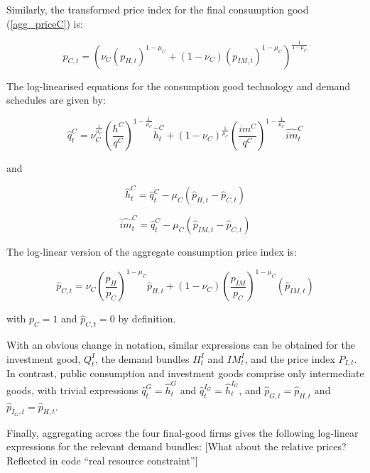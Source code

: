 \documentclass[a4paper,11pt]{article}
\numberwithin{equation}{section}
\begin{document}
	Similarly, the transformed price index for the final consumption good (\ref{agg_priceC}) is:
	
	\begin{equation}
	p_{C,t}=\left(\nu_C\left(p_{H,t}\right)^{1-\mu_C}+(1-\nu_C)\left(p_{IM,t}\right)^{1-\mu_C}\right)^{\frac{1}{1-\mu_C}}
	\end{equation}
	
	The log-linearised equations for the consumption good technology and demand schedules are given by:
	
	\begin{equation}
	\hat{q}_t^C=\nu_C^{\frac{1}{\mu_C}}\left(\frac{h^C}{q^C}\right)^{1-\frac{1}{\mu_C}}\hat{h}_t^C+(1-\nu_C)^{\frac{1}{\mu_C}}\left(\frac{im^C}{q^C}\right)^{1-\frac{1}{\mu_C}}\widehat{im}_t^C
	\end{equation}
	
	and
	
	\begin{equation}
	\hat{h}_t^C=\hat{q}_t^C-\mu_C\left(\hat{p}_{H,t}-\hat{p}_{C,t}\right)
	\end{equation}
	
	\begin{equation}
	\widehat{im}_t^C=\hat{q}_t^C-\mu_C\left(\hat{p}_{IM,t}-\hat{p}_{C,t}\right)
	\end{equation}
	
	The log-linear version of the aggregate consumption price index is:
	
	\begin{equation}
	\hat{p}_{C,t}=\nu_C\left(\frac{p_H}{p_C}\right)^{1-\mu_C}\hat{p}_{H,t}+(1-\nu_C)\left(\frac{p_{IM}}{p_C}\right)^{1-\mu_C}\left(\hat{p}_{IM,t}\right)
	\end{equation}
	
	with $p_C=1$ and $\hat{p}_{C,t}=0$ by definition.
	
	With an obvious change in notation, similar expressions can be obtained for the investment good, $Q_t^I$, the demand bundles $H_t^I$ and $IM_t^I$, and the price index $P_{I,t}$. In contrast, public consumption and investment goods comprise only intermediate goods, with trivial expressions $\hat{q}_t^G=\hat{h}_t^G$ and $\hat{q}_t^{I_G}=\hat{h}_t^{I_G}$, and $\hat{p}_{G,t}=\hat{p}_{H,t}$ and $\hat{p}_{I_G,t}=\hat{p}_{H,t}$.
	
	Finally, aggregating across the four final-good firms gives the following log-linear expressions for the relevant demand bundles: {\color{red}[What about the relative prices? Reflected in code ``real resource constraint'']}
	
\end{document}
